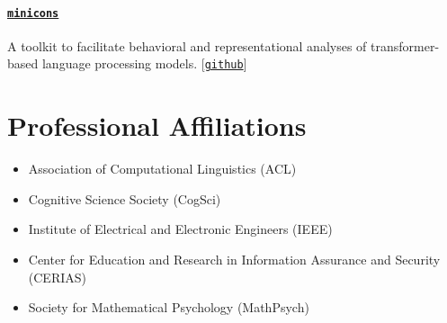 \documentclass[11pt]{article}
\newcommand{\github}[1]{[\href{#1}{\texttt{github}}]}
\begin{document}
\paragraph{\href{https://pypi.org/project/minicons/}{\texttt{minicons}}} A toolkit to facilitate behavioral and representational analyses of transformer-based language processing models. \github{https://github.com/kanishkamisra/minicons}




\section*{Professional Affiliations}
\begin{itemize}
    \item Association of Computational Linguistics (ACL)
    \item Cognitive Science Society (CogSci)
    \item Institute of Electrical and Electronic Engineers (IEEE)
    \item Center for Education and Research in Information Assurance and Security (CERIAS)
    \item Society for Mathematical Psychology (MathPsych)
\end{itemize}
\end{document}

